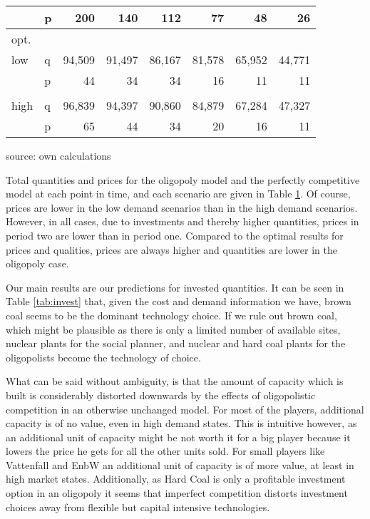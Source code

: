 \begin{table}
\begin{tabular}{llrrrrrr}
           &          p &        200 &        140 &        112 &         77 &         48 &         26 \\
\hline
   opt. &            &            &            &            &            &            &            \\
       low &          q &     94,509 &     91,497 &     86,167 &     81,578 &     65,952 &     44,771 \\
           &          p &         44 &         34 &         34 &         16 &         11 &         11 \\
           &            &            &            &            &            &            &            \\
      high &          q &     96,839 &     94,397 &     90,860 &     84,879 &     67,284 &     47,327 \\
           &          p &         65 &         44 &         34 &         20 &         16 &         11 \\
\hline
\hline
\end{tabular}  

\label{tab:dynquant}
\begin{center}
source: own calculations
\end{center}
\end{table}

Total quantities and prices for the oligopoly model and the perfectly competitive model at each point in time, and each scenario are given in Table \ref{tab:dynquant}. Of course, prices are lower in the low demand scenarios than in the high demand scenarios. However, in all cases, due to investments and thereby higher quantities, prices in period two are lower than in period one.
Compared to the optimal results for prices and qualities, prices are always higher and quantities are lower in the oligopoly case.

Our main results are our predictions for invested quantities. It can be seen in Table \ref{tab:invest} that, given the cost and demand information we have, brown coal seems to be the dominant technology choice. If we rule out brown coal, which might be plausible as there is only a limited number of available sites, nuclear plants for the social planner, and nuclear and hard coal plants for the oligopolists become the technology of choice.

What can be said without ambiguity, is that the amount of capacity which is built is considerably distorted downwards by the effects of oligopolistic competition in an otherwise unchanged model. For most of the players, additional capacity is of no value, even in high demand states. This is intuitive however, as an additional unit of capacity might be not worth it for a big player because it lowers the price he gets for all the other units sold. For small players like Vattenfall and EnbW an additional unit of capacity is of more value, at least in high market states. Additionally, as Hard Coal is only a profitable investment option in an oligopoly it seems that imperfect competition distorts investment choices away from flexible but capital intensive technologies.


